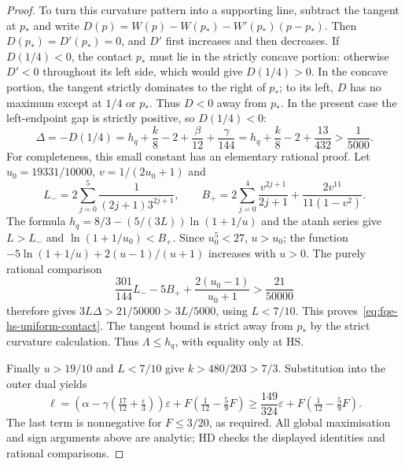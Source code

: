 \begin{proof}
To turn this curvature pattern into a supporting line, subtract the
tangent at $p_*$ and write
$D(p)=W(p)-W(p_*)-W'(p_*)(p-p_*)$.
Then $D(p_*)=D'(p_*)=0$, and $D'$ first increases and then decreases.
If $D(1/4)<0$, the contact $p_*$ must lie in the strictly concave portion:
otherwise $D'<0$ throughout its left side, which would give
$D(1/4)>0$. In the concave portion, the tangent strictly
dominates to the right of $p_*$; to its left, $D$ has no maximum except
at $1/4$ or $p_*$. Thus $D<0$ away from $p_*$.
In the present case the
left-endpoint gap is strictly positive, so $D(1/4)<0$:
\[
 \Delta=-D(1/4)=h_q+\frac k8-2+\frac\beta{12}+\frac\gamma{144}
 =h_q+\frac k8-2+\frac{13}{432}>\frac1{5000}.
 \tag{HUC}\label{eq:fqe-hs-uniform-contact}
\]
For completeness, this small constant has an elementary rational proof.
Let $u_0=19331/10000$, $v=1/(2u_0+1)$ and
\[
 L_-=2\sum_{j=0}^5\frac{1}{(2j+1)3^{2j+1}},\qquad
 B_+=2\sum_{j=0}^4\frac{v^{2j+1}}{2j+1}
             +\frac{2v^{11}}{11(1-v^2)}.
\]
The formula $h_q=8/3-(5/(3L))\ln(1+1/u)$ and the atanh series give $L>L_-$ and
$\ln(1+1/u_0)<B_+$. Since $u_0^5<27$, $u>u_0$; the function
$-5\ln(1+1/u)+2(u-1)/(u+1)$ increases with $u>0$.
The purely rational comparison
\[
 \frac{301}{144}L_- -5B_+ +\frac{2(u_0-1)}{u_0+1}
 >\frac{21}{50000}
\]
therefore gives $3L\Delta>21/50000>3L/5000$, using $L<7/10$.
This proves~\eqref{eq:fqe-hs-uniform-contact}.
The tangent bound is strict away from $p_*$ by the strict curvature
calculation. Thus $\Lambda\le h_q$, with equality only at HS.

Finally $u>19/10$ and $L<7/10$ give
$k>480/203>7/3$. Substitution into the outer dual yields
\[
 \ell=\left(\alpha-\gamma(\tfrac{17}{12}+\tfrac\varepsilon3)\right)\varepsilon
          +F\left(\tfrac1{12}-\tfrac59F\right)
 \ge\frac{149}{324}\varepsilon+F\left(\tfrac1{12}-\tfrac59F\right).
\]
The last term is nonnegative for $F\le3/20$, as required.
All global maximisation and sign arguments above are analytic;
HD checks the displayed identities and rational comparisons.
\end{proof}
